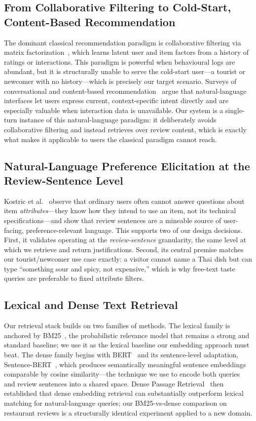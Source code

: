 \documentclass[10pt,twocolumn]{article}
\begin{document}
\subsection{From Collaborative Filtering to Cold-Start, Content-Based Recommendation}
The dominant classical recommendation paradigm is collaborative filtering via matrix
factorization~\cite{koren2009mf}, which learns latent user and item factors from a
history of ratings or interactions. This paradigm is powerful when behavioural logs are
abundant, but it is structurally unable to serve the cold-start user---a tourist or
newcomer with no history---which is precisely our target scenario. Surveys of
conversational and content-based recommendation~\cite{gao2021crs} argue that
natural-language interfaces let users express current, context-specific intent directly
and are especially valuable when interaction data is unavailable. Our system is a
single-turn instance of this natural-language paradigm: it deliberately avoids
collaborative filtering and instead retrieves over review content, which is exactly what
makes it applicable to users the classical paradigm cannot reach.

\subsection{Natural-Language Preference Elicitation at the Review-Sentence Level}
Kostric et al.~\cite{kostric2024usage} observe that ordinary users often cannot answer
questions about item \emph{attributes}---they know how they intend to use an item, not
its technical specifications---and show that review sentences are a mineable source of
user-facing, preference-relevant language. This supports two of our design decisions.
First, it validates operating at the \emph{review-sentence} granularity, the same level
at which we retrieve and return justifications. Second, its central premise matches our
tourist/newcomer use case exactly: a visitor cannot name a Thai dish but can type
``something sour and spicy, not expensive,'' which is why free-text taste queries are
preferable to fixed attribute filters.

\subsection{Lexical and Dense Text Retrieval}
Our retrieval stack builds on two families of methods. The lexical family is anchored by
BM25~\cite{robertson2009bm25}, the probabilistic relevance model that remains a strong
and standard baseline; we use it as the lexical baseline our embedding approach must
beat. The dense family begins with BERT~\cite{devlin2019bert} and its sentence-level
adaptation, Sentence-BERT~\cite{reimers2019sbert}, which produces semantically
meaningful sentence embeddings comparable by cosine similarity---the technique we use to
encode both queries and review sentences into a shared space. Dense Passage
Retrieval~\cite{karpukhin2020dpr} then established that dense embedding retrieval can
substantially outperform lexical matching for natural-language queries; our BM25-vs-dense
comparison on restaurant reviews is a structurally identical experiment applied to a new
domain.
\end{document}

